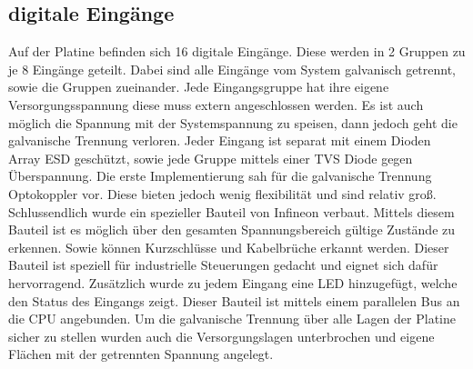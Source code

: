 \documentclass[praktikum,german]{hgbthesis}
\begin{document}
\subsection{digitale Eingänge}
Auf der Platine befinden sich 16 digitale Eingänge. Diese werden in 2 Gruppen zu je 8 Eingänge geteilt. Dabei sind alle Eingänge vom System galvanisch getrennt, sowie die Gruppen zueinander. Jede Eingangsgruppe hat ihre eigene Versorgungsspannung diese muss extern angeschlossen werden. Es ist auch möglich die Spannung mit der Systemspannung zu speisen, dann jedoch geht die galvanische Trennung verloren. Jeder Eingang ist separat mit einem Dioden Array ESD geschützt, sowie jede Gruppe mittels einer TVS Diode gegen Überspannung. Die erste Implementierung sah für die galvanische Trennung Optokoppler vor. Diese bieten jedoch wenig flexibilität und sind relativ groß. Schlussendlich wurde ein spezieller Bauteil von Infineon verbaut. Mittels diesem Bauteil ist es möglich über den gesamten Spannungsbereich gültige Zustände zu erkennen. Sowie können Kurzschlüsse und Kabelbrüche erkannt werden. Dieser Bauteil ist speziell für industrielle Steuerungen gedacht und eignet sich dafür hervorragend. Zusätzlich wurde zu jedem Eingang eine LED hinzugefügt, welche den Status des Eingangs zeigt. Dieser Bauteil ist mittels einem parallelen Bus an die CPU angebunden. Um die galvanische Trennung über alle Lagen der Platine sicher zu stellen wurden auch die Versorgungslagen unterbrochen und eigene Flächen mit der getrennten Spannung angelegt.
\end{document}
